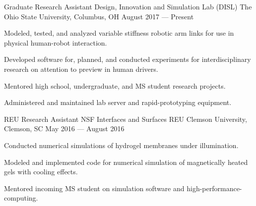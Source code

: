 

\begin{cventries}

  \cventry
    {Graduate Research Assistant} %
    {Design, Innovation and Simulation Lab (DISL)} %
    {The Ohio State University, Columbus, OH} %
    {August 2017 --- Present} %
    {
      \begin{cvitems} %
        \item{Modeled, tested, and analyzed variable stiffness robotic arm links for use in physical human-robot interaction.}
        \item{Developed software for, planned, and conducted experiments for interdisciplinary research on attention to preview in human drivers.}
        \item{Mentored high school, undergraduate, and MS student research projects.}
        \item{Administered and maintained lab server and rapid-prototyping equipment.}
      \end{cvitems}
    }

  \cventry
    {REU Research Assistant} %
    {NSF Interfaces and Surfaces REU} %
    {Clemson University, Clemson, SC} %
    {May 2016 --- August 2016} %
    {
      \begin{cvitems} %
        \item {Conducted numerical simulations of hydrogel membranes under illumination.}
        \item {Modeled and implemented code for numerical simulation of magnetically heated gels with cooling effects.}
        \item {Mentored incoming MS student on simulation software and high-performance-computing.}
      \end{cvitems}
    }


\end{cventries}
